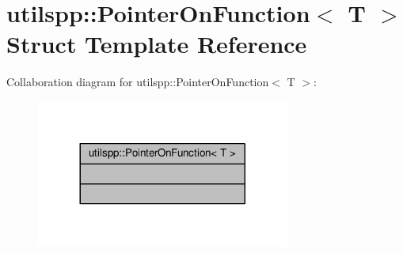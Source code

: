 \hypertarget{structutilspp_1_1PointerOnFunction}{\section{utilspp\-:\-:Pointer\-On\-Function$<$ T $>$ Struct Template Reference}
\label{structutilspp_1_1PointerOnFunction}
}


Collaboration diagram for utilspp\-:\-:Pointer\-On\-Function$<$ T $>$\-:
\nopagebreak
\begin{figure}[H]
\begin{center}
\leavevmode
\includegraphics[width=236pt]{structutilspp_1_1PointerOnFunction__coll__graph}
\end{center}
\end{figure}
